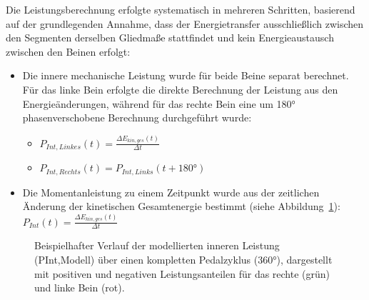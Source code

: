 \documentclass[
  letterpaper,
  DIV=11]{scrartcl}
\begin{document}
Die Leistungsberechnung erfolgte systematisch in mehreren Schritten,
basierend auf der grundlegenden Annahme, dass der Energietransfer
ausschließlich zwischen den Segmenten derselben Gliedmaße stattfindet
und kein Energieaustausch zwischen den Beinen erfolgt:

\begin{itemize}
\item
  Die innere mechanische Leistung wurde für beide Beine separat
  berechnet. Für das linke Bein erfolgte die direkte Berechnung der
  Leistung aus den Energieänderungen, während für das rechte Bein eine
  um 180° phasenverschobene Berechnung durchgeführt wurde:

  \begin{itemize}
  \item
    \(P_{Int,Linkes}(t) = \frac{\Delta E_{kin,ges}(t)}{\Delta t}\)
  \item
    \(P_{Int,Rechts}(t) = P_{Int,Links}(t + 180°)\)
  \end{itemize}
\item
  Die Momentanleistung zu einem Zeitpunkt wurde aus der zeitlichen
  Änderung der kinetischen Gesamtenergie bestimmt (siehe
  Abbildung~\ref{fig-PInt_Modell_Zyklus}):
  \(P_{Int}(t) = \frac{\Delta E_{kin,ges}(t)}{\Delta t}\)
\end{itemize}

\begin{figure}


\caption{\label{fig-PInt_Modell_Zyklus}Beispielhafter Verlauf der
modellierten inneren Leistung (PInt,Modell) über einen kompletten
Pedalzyklus (360°), dargestellt mit positiven und negativen
Leistungsanteilen für das rechte (grün) und linke Bein (rot).}

\end{figure}%
\end{document}
